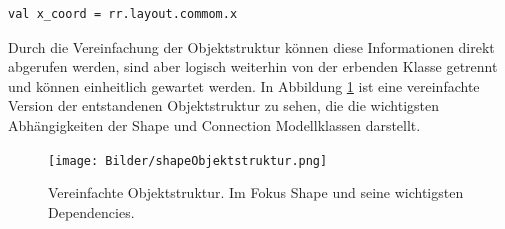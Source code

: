 \begin{lstlisting}[style=scala, aboveskip=0pt]
val x_coord = rr.layout.commom.x
\end{lstlisting}Durch die Vereinfachung der Objektstruktur können diese Informationen direkt abgerufen werden, sind aber logisch weiterhin von der erbenden Klasse getrennt und können einheitlich gewartet werden. In Abbildung \ref{objectstructureShape} ist eine vereinfachte Version der entstandenen Objektstruktur zu sehen, die die wichtigsten Abhängigkeiten der Shape und Connection Modellklassen darstellt.
\begin{figure}[H]
\begin{center}
\texttt{[image: Bilder/shapeObjektstruktur.png]}
\caption{Vereinfachte Objektstruktur. Im Fokus Shape und seine wichtigsten Dependencies.}
\label{objectstructureShape}
\end{center}
\end{figure}

